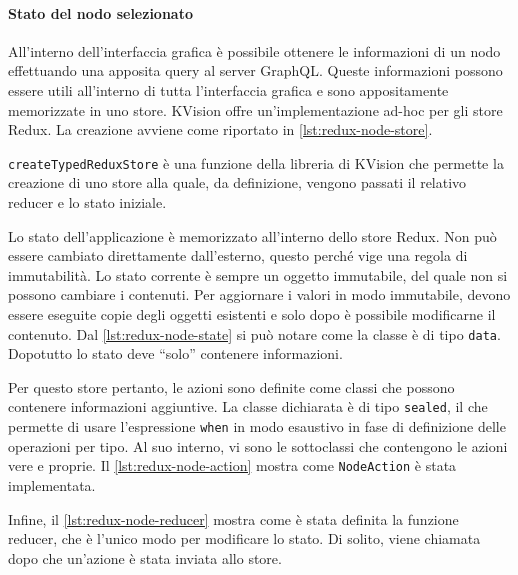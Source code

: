 \paragraph{Stato del nodo selezionato}
All'interno dell'interfaccia grafica è possibile ottenere le informazioni di un nodo effettuando una apposita query al server GraphQL. Queste informazioni possono essere utili all'interno di tutta l'interfaccia grafica e sono appositamente memorizzate in uno store. KVision offre un'implementazione ad-hoc per gli store Redux. La creazione avviene come riportato in \cref{lst:redux-node-store}.

\texttt{createTypedReduxStore} è una funzione della libreria di KVision che permette la creazione di uno store alla quale, da definizione, vengono passati il relativo reducer e lo stato iniziale.

Lo stato dell'applicazione è memorizzato all'interno dello store Redux. Non può essere cambiato direttamente dall'esterno, questo perché vige una regola di immutabilità. Lo stato corrente è sempre un oggetto immutabile, del quale non si possono cambiare i contenuti. Per aggiornare i valori in modo immutabile, devono essere eseguite copie degli oggetti esistenti e solo dopo è possibile modificarne il contenuto. Dal \cref{lst:redux-node-state} si può notare come la classe è di tipo \texttt{data}. Dopotutto lo stato deve ``solo'' contenere informazioni.



Per questo store pertanto, le azioni sono definite come classi che possono contenere informazioni aggiuntive. La classe dichiarata è di tipo \texttt{sealed}, il che permette di usare l'espressione \texttt{when} in modo esaustivo in fase di definizione delle operazioni per tipo. Al suo interno, vi sono le sottoclassi che contengono le azioni vere e proprie. Il \cref{lst:redux-node-action} mostra come \texttt{NodeAction} è stata implementata.



Infine, il \cref{lst:redux-node-reducer} mostra come è stata definita la funzione reducer, che è l'unico modo per modificare lo stato. Di solito, viene chiamata dopo che un'azione è stata inviata allo store.

